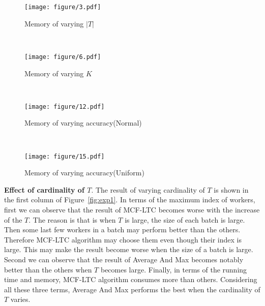 \begin{figure*}[htb]
	\begin{subfigure}[b]{0.22\textwidth}
		\texttt{[image: figure/3.pdf]}
		\caption{\footnotesize{Memory of varying $|T|$}}
		\label{fig:card_t_time}
	\end{subfigure}
	~~
	\begin{subfigure}[b]{0.22\textwidth}
		\texttt{[image: figure/6.pdf]}
		\caption{\footnotesize{Memory of varying $K$}}
		\label{fig:card_w_time}
	\end{subfigure}
	~~
	\begin{subfigure}[b]{0.22\textwidth}
		\texttt{[image: figure/12.pdf]}
		\caption{\footnotesize{Memory of varying accuracy(Normal)}}
		\label{fig:card_p_time}
	\end{subfigure}
	~~
	\begin{subfigure}[b]{0.22\textwidth}
		\texttt{[image: figure/15.pdf]}
		\caption{\footnotesize{Memory of varying accuracy(Uniform)}}
		\label{fig:cf_mem}
	\end{subfigure}
	\caption{Results on varying cardinality, capacity, and historical accuracy}
	\vspace{-3ex}
	\label{fig:exp1}
\end{figure*}

\textbf{Effect of cardinality of $T$}.
The result of varying cardinality of $T$ is shown in the first column of Figure~\ref{fig:exp1}. 
In terms of the maximum index of workers, first we can observe that the result of MCF-LTC becomes worse with the increase of the $T$. 
The reason is that is when $T$ is large, the size of each batch is large. 
Then some last few workers in a batch may perform better than the others. 
Therefore MCF-LTC algorithm may choose them even though their index is large. 
This may make the result become worse when the size of a batch is large. 
Second we can observe that the result of Average And Max becomes notably better than the others when $T$ becomes large. 
Finally, in terms of the running time and memory, MCF-LTC algorithm consumes more than others. 
Considering all these three terms, Average And Max performs the best when the cardinality of $T$ varies.

